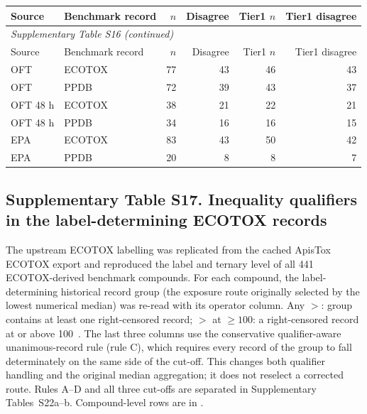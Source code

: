 \begin{longtable}{llrrrr}

\toprule Source & Benchmark record & $n$ & Disagree & Tier1 $n$ & Tier1 disagree \\ \midrule\endfirsthead

\multicolumn{6}{l}{\textit{Supplementary Table S16 (continued)}} \\

\toprule Source & Benchmark record & $n$ & Disagree & Tier1 $n$ & Tier1 disagree \\ \midrule\endhead

\bottomrule\endlastfoot

OFT & ECOTOX & 77 & 43 & 46 & 43 \\
OFT & PPDB & 72 & 39 & 43 & 37 \\
OFT 48 h & ECOTOX & 38 & 21 & 22 & 21 \\
OFT 48 h & PPDB & 34 & 16 & 16 & 15 \\
EPA & ECOTOX & 83 & 43 & 50 & 42 \\
EPA & PPDB & 20 & 8 & 8 & 7 \\

\end{longtable}\endgroup

\subsection*{Supplementary Table S17. Inequality qualifiers in the label-determining ECOTOX records}

The upstream ECOTOX labelling was replicated from the cached ApisTox ECOTOX export and reproduced the label and ternary level of all 441 ECOTOX-derived benchmark compounds. For each compound, the label-determining historical record group (the exposure route originally selected by the lowest numerical median) was re-read with its operator column. Any $>$: group contains at least one right-censored record; $>$ at $\geq100$: a right-censored record at or above 100~\ugbee. The last three columns use the conservative qualifier-aware unanimous-record rule (rule C), which requires every record of the group to fall determinately on the same side of the cut-off. This changes both qualifier handling and the original median aggregation; it does not reselect a corrected route. Rules A--D and all three cut-offs are separated in Supplementary Tables~S22a--b. Compound-level rows are in .

